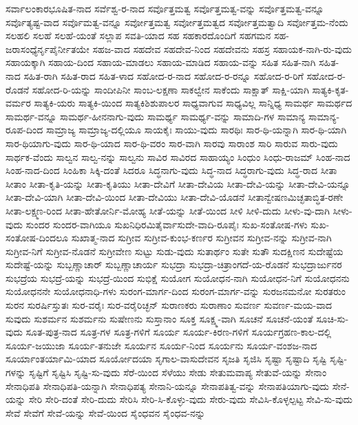 {ಸರ್ವಾಲಂಕಾರಭೂಷಿತ-ನಾದ
ಸರ್ವೆಶ್ವ-ರ-ನಾದ
ಸರ್ವೊತ್ತಮತ್ವ
ಸರ್ವೊತ್ತಮತ್ವ-ವನ್ನು
ಸರ್ವೊತ್ತಮತ್ವ-ವನ್ನೂ
ಸರ್ವೊತ್ಯಷ್ಟ-ವಾದ
ಸರ್ವೊಮತ್ವ-ವನ್ನೂ
ಸರ್ವೋತ್ತಮತ್ವ
ಸರ್ವೋತ್ತಮತ್ವದ
ಸರ್ವೋತ್ತಮತ್ವಾದಿ
ಸರ್ವೋತ್ತಮ-ನೆಂದು
ಸಲಹಲಿ
ಸಲಹೆ
ಸಲಹೆ-ಯಂತೆ
ಸಲ್ಲಾಪ
ಸವತಿ-ಯಾದ
ಸಹ
ಸಹಕಾರದೊಂದಿಗೆ
ಸಹಗಮನ
ಸಹ-ಜರಾಸಂಧ್ಯೆರ್ನೃಪೈರ್ನೀತಯೇ
ಸಹಜ-ವಾದ
ಸಹದೇವ
ಸಹದೇವ-ನಿಂದ
ಸಹದೇವನು
ಸಹಸ್ರ
ಸಹಾಯಕ-ನಾಗಿ-ರು-ವುದು
ಸಹಾಯಕ್ಕಾಗಿ
ಸಹಾಯ-ದಿಂದ
ಸಹಾಯ-ಮಾಡಲು
ಸಹಾಯ-ಮಾಡಿದ
ಸಹಾಯ-ವನ್ನು
ಸಹಿತ
ಸಹಿತ-ನಾಗಿ
ಸಹಿತ-ನಾದ
ಸಹಿತ-ರಾಗಿ
ಸಹಿತ-ರಾದ
ಸಹಿತ-ಳಾದ
ಸಹೋದ-ರ-ನಾದ
ಸಹೋದ-ರ-ರನ್ನೂ
ಸಹೋದ-ರ-ರಿಗೆ
ಸಹೋದ-ರ-ರೊಡನೆ
ಸಹೋದ-ರಿ-ಯನ್ನು
ಸಾಂದೀಪಿನೀ
ಸಾಂಬ-ಲಕ್ಷಣಾ
ಸಾಕಲ್ವೇನ
ಸಾಕೆಂದು
ಸಾಕ್ಷಾತ್
ಸಾಕ್ಷಿ-ಯಾಗಿ
ಸಾತ್ಯಕಿ-ಕೃತ-ವರ್ಮರ
ಸಾತ್ಯಕಿ-ಯರು
ಸಾತ್ಯಕಿ-ಯಿಂದ
ಸಾತ್ಯಕಿಶಿಶುಪಾಲರ
ಸಾಧ್ಯವಾಗುವ
ಸಾಧ್ಯವಿಲ್ಲ
ಸಾನ್ನಿಧ್ಯ
ಸಾಮರ್ಥ
ಸಾಮರ್ಥದ
ಸಾಮರ್ಥ-ವನ್ನೂ
ಸಾಮರ್ಥ-ಹೀನನಾಗು-ವುದು
ಸಾಮರ್ಥ್ಯ
ಸಾಮರ್ಥ್ಯ-ವನ್ನು
ಸಾಮಾದಿ-ಗಳ
ಸಾಮಾನ್ಯ
ಸಾಮಾನ್ಯ-ರೂಪ-ದಿಂದ
ಸಾಮ್ರಾಜ್ಯ
ಸಾಮ್ರಾಜ್ಯ-ದಲ್ಲಿಯೂ
ಸಾಯಕೈಃ
ಸಾಯು-ವುದು
ಸಾರಥಿಃ
ಸಾರ-ಥಿ-ಯನ್ನಾಗಿ
ಸಾರ-ಥಿ-ಯಾಗಿ
ಸಾರ-ಥಿಯಾಗು-ವುದು
ಸಾರ-ಥಿ-ಯಾದ
ಸಾರ-ಥಿ-ವರಂ
ಸಾರ-ವಾಗಿ
ಸಾರವು
ಸಾರಾಂಶ
ಸಾರಿ
ಸಾರುವ
ಸಾರು-ವುದು
ಸಾರ್ಥಕ-ವೆಂದು
ಸಾಲ್ವನ
ಸಾಲ್ವ-ನನ್ನು
ಸಾಲ್ವನು
ಸಾವಿರ
ಸಾವಿರದ
ಸಾಹಾಯ್ಯಂ
ಸಿಂಧುಂ
ಸಿಂಧು-ರಾಜಮ್
ಸಿಂಹ-ನಾದ
ಸಿಂಹ-ನಾದ-ದಿಂದ
ಸಿಂಹಿಕಾ
ಸಿಕ್ಕಿ-ದಂತೆ
ಸಿದರೂ
ಸಿದ್ಧನಾಗು-ವುದು
ಸಿದ್ಧ-ನಾದ
ಸಿದ್ಧರಾಗು-ವುದು
ಸಿದ್ಧ-ರಾದ
ಸೀತಾ
ಸೀತಾಂ
ಸೀತಾ-ಕೃತಿ-ಯನ್ನು
ಸೀತಾ-ಕೃತಿಯು
ಸೀತಾ-ದೇವಿಗೆ
ಸೀತಾ-ದೇವಿಯ
ಸೀತಾ-ದೇವಿ-ಯನ್ನು
ಸೀತಾ-ದೇವಿ-ಯನ್ನೂ
ಸೀತಾ-ದೇವಿ-ಯಾಗಿ
ಸೀತಾ-ದೇವಿ-ಯಿಂದ
ಸೀತಾ-ದೇವಿಯು
ಸೀತಾ-ದೇವಿ-ಯೊಡನೆ
ಸೀತಾನ್ವೇಷಣಮಿಚ್ಛತಾಬ್ಧಿತ-ರಣೇ
ಸೀತಾ-ಲಕ್ಷ್ಮಣ-ರಿಂದ
ಸೀತಾ-ಹೇತೋರ್ನಿ-ಮೋಹ್ಯ
ಸೀತೆ-ಯನ್ನು
ಸೀತೆ-ಯಿಂದ
ಸೀಳಿ
ಸೀಳಿ-ದುದು
ಸೀಳು-ವು-ದಾಗಿ
ಸೀಳು-ವುದು
ಸುಂದರ
ಸುಂದರ-ವಾಗಿಯೂ
ಸುಖನಿಧಿರಮಿತೈರ್ವಾಸುದೇ-ವಾದಿ-ರೂಪೈಃ
ಸುಖ-ಸಂತೋಷ-ಗಳು
ಸುಖ-ಸಂತೋಷ-ದಿಂದಲೂ
ಸುಖಾತ್ಮ-ನಾದ
ಸುಗ್ರೀವ
ಸುಗ್ರೀವ-ಕುಂಭ-ಕರ್ಣರ
ಸುಗ್ರೀವನ
ಸುಗ್ರೀವ-ನನ್ನು
ಸುಗ್ರೀವ-ನಾಗಿ
ಸುಗ್ರೀವ-ನಿಗೆ
ಸುಗ್ರೀವ-ನೊಡನೆ
ಸುಗ್ರೀವೇಣ
ಸುಟ್ಟು
ಸುಡು-ವುದು
ಸುತಾರ್ಥಂ
ಸುತೇ
ಸುತೌ
ಸುದಕ್ಷಿಣನ
ಸುದೇಷ್ಟೆಯ
ಸುದೇಷ್ಟೆ-ಯನ್ನು
ಸುಬ್ಬಣ್ಣಾಚಾರ್
ಸುಬ್ಬಣ್ಣಾಚಾರ್ಯ
ಸುಭದ್ರಾ
ಸುಭದ್ರಾ-ಚಿತ್ರಾಂಗದೆ-ಯ-ರೊಡನೆ
ಸುಭದ್ರಾರ್ಜುನರ
ಸುಭದ್ರೆಯ
ಸುಭದ್ರೆ-ಯನ್ನು
ಸುಭದ್ರೆ-ಯಿಂದ
ಸುಭಿಕ್ಷೆ
ಸುಯೋಗ
ಸುಯೋಧನ-ನಾಗಿ
ಸುಯೋಧನ-ನಿಗೆ
ಸುಯೋಧನನು
ಸುಯೋಧನನೇ
ಸುಯೋಧನಾಧಿ-ಗಳು
ಸುರಂಗ-ಮಾರ್ಗ-ದಿಂದ
ಸುರಂಗ-ಮಾರ್ಗ-ವನ್ನು
ಸುರಜನಮನೋ
ಸುರತರುಂ
ಸುರನ
ಸುರರ್ಷಿಸ್ತುತಃ
ಸುರ-ವರೈಃ
ಸುರ-ವರೈರಿಚ್ಛನ್
ಸುರಾಣಕರು
ಸುರಾಣಾಂ
ಸುವರ್ಣ
ಸುವರ್ಣ-ಮಯ-ವಾದ
ಸುವುದು
ಸುಶರ್ಮನ
ಸುಶರ್ಮನು
ಸುಷೇಣನು
ಸುಸ್ತಾನಾಂ
ಸೂಕ್ತ
ಸೂಕ್ಷ್ಮ-ವಾಗಿ
ಸೂಚನೆ
ಸೂಚನೆ-ಯಂತೆ
ಸೂಚಿ-ಸು-ವುದು
ಸೂತ-ಪುತ್ರ-ನಾದ
ಸೂತ್ರ-ಗಳ
ಸೂತ್ರ-ಗಳಿಗೆ
ಸೂರ್ಯ
ಸೂರ್ಯ-ಕಿರಣ-ಗಳಿಗೆ
ಸೂರ್ಯಗ್ರಹಣ-ಕಾಲ-ದಲ್ಲಿ 
ಸೂರ್ಯ-ಜಯುಜಾ
ಸೂರ್ಯ-ತನುಜೇ
ಸೂರ್ಯನ
ಸೂರ್ಯ-ನಿಂದ
ಸೂರ್ಯನು
ಸೂರ್ಯ-ವಂಶಜ-ನಾದ
ಸೂರ್ಯಾಂತರ್ಯಾಮಿ-ಯಾದ
ಸೂರ್ಯೋದಯಾ
ಸೃಗಾಲ-ವಾಸುದೇವನ
ಸೃಜತಿ
ಸೃಜಿಸಿ
ಸೃಷ್ಟಾ
ಸೃಷ್ಟಾದಿ
ಸೃಷ್ಟಿ
ಸೃಷ್ಟಿ-ಗಳನ್ನು
ಸೃಷ್ಟಿಗೆ
ಸೃಷ್ಟಿಸಿ
ಸೃಷ್ಟಿ-ಸು-ವುದು
ಸೆರೆ-ಯಿಂದ
ಸೆಳೆಯು
ಸೇಡು
ಸೇತುಮವಾಪ್ಯ
ಸೇತುವೆ-ಯನ್ನು
ಸೇನಾಂ
ಸೇನಾಧಿಪತಿ
ಸೇನಾಧಿಪತಿ-ಯನ್ನಾಗಿ
ಸೇನಾಧಿಪತ್ಯ
ಸೇನಾನಿ-ಯನ್ನೂ
ಸೇನಾಪತಿತ್ವ-ವನ್ನು
ಸೇನಾಪತಿಯಾಗು-ವುದು
ಸೇನೆ-ಯನ್ನು
ಸೇರಿ
ಸೇರಿ-ದಂತೆ
ಸೇರಿ-ದುದು
ಸೇರಿಸಿ
ಸೇರಿ-ಸಿ-ಕೊಳ್ಳು-ವುದು
ಸೇರು-ವುದು
ಸೇವಿಸಿ-ಕೊಳ್ಳಲ್ಪಟ್ಟ
ಸೇವಿ-ಸು-ವುದು
ಸೇವೆ
ಸೇವೆಗೆ
ಸೇವೆ-ಯನ್ನು
ಸೇವೆ-ಯಿಂದ
ಸೈಂಧವನ
ಸೈಂಧವ-ನನ್ನು
}
